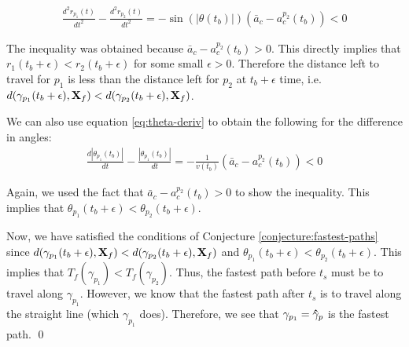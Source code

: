 \begin{eqnarray}
  \frac{d^2 r_{p_1}(t)}{d t^2} - \frac{d^2 r_{p_2}(t)}{d t^2} = - \sin(| \theta(t_b) |) \left( \bar{a}_c - a^{p_2}_c(t_b) \right) < 0
\end{eqnarray}

The inequality was obtained because $\bar{a}_c - a^{p_2}_c(t_b) > 0$. This directly implies that $r_1(t_b + \epsilon) < r_2(t_b + \epsilon)$ for some small $\epsilon > 0$. Therefore the distance left to travel for $p_1$ is less than the distance left for $p_2$ at $t_b + \epsilon$ time, i.e. $d(\gamma_{p_1}(t_b + \epsilon), \mathbf{X}_f) < d(\gamma_{p_2}(t_b + \epsilon), \mathbf{X}_f)$.

We can also use equation \ref{eq:theta-deriv} to obtain the following for the difference in angles:
\begin{eqnarray}
  \frac{d | \theta_{p_1}(t_b) |}{dt} - \frac{ |\theta_{p_1} (t_b) |}{dt} = - \frac{1}{v(t_b)} \left(\bar{a}_c - a^{p_2}_c(t_b) \right) < 0
\end{eqnarray}

Again, we used the fact that $\bar{a}_c - a^{p_2}_c(t_b) > 0$ to show the inequality. This implies that $\theta_{p_1}(t_b + \epsilon) < \theta_{p_2}(t_b + \epsilon)$.

Now, we have satisfied the conditions of Conjecture \ref{conjecture:fastest-paths} since $d(\gamma_{p_1}(t_b + \epsilon), \mathbf{X}_f) < d(\gamma_{p_2}(t_b + \epsilon), \mathbf{X}_f)$ and $\theta_{p_1}(t_b + \epsilon) < \theta_{p_2}(t_b + \epsilon)$. This implies that $T_f(\gamma_{p_1}) < T_f(\gamma_{p_2})$. Thus, the fastest path before $t_s$ must be to travel along $\gamma_{p_1}$. However, we know that the fastest path after $t_s$ is to travel along the straight line (which $\gamma_{p_1}$ does). Therefore, we see that $\gamma_{p_1} = \mathbf{\hat{\gamma}}_p$ is the fastest path.
\qed

